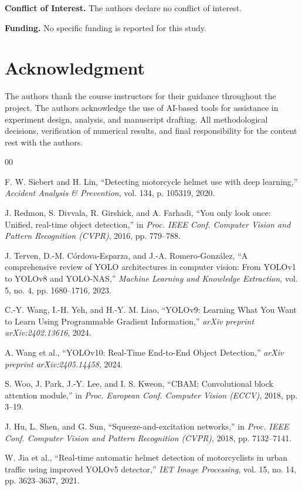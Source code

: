 \documentclass[conference]{IEEEtran}
\begin{document}
\textbf{Conflict of Interest.} The authors declare no conflict of interest.

\textbf{Funding.} No specific funding is reported for this study.

\section*{Acknowledgment}

The authors thank the course instructors for their guidance throughout the project. The authors acknowledge the use of AI-based tools for assistance in experiment design, analysis, and manuscript drafting. All methodological decisions, verification of numerical results, and final responsibility for the content rest with the authors.

\begin{thebibliography}{00}

 F. W. Siebert and H. Lin, ``Detecting motorcycle helmet use with deep learning,'' \textit{Accident Analysis \& Prevention}, vol. 134, p. 105319, 2020.

 J. Redmon, S. Divvala, R. Girshick, and A. Farhadi, ``You only look once: Unified, real-time object detection,'' in \textit{Proc. IEEE Conf. Computer Vision and Pattern Recognition (CVPR)}, 2016, pp. 779--788.

 J. Terven, D.-M. C\'ordova-Esparza, and J.-A. Romero-Gonz\'alez, ``A comprehensive review of YOLO architectures in computer vision: From YOLOv1 to YOLOv8 and YOLO-NAS,'' \textit{Machine Learning and Knowledge Extraction}, vol. 5, no. 4, pp. 1680--1716, 2023.

 C.-Y. Wang, I.-H. Yeh, and H.-Y. M. Liao, ``YOLOv9: Learning What You Want to Learn Using Programmable Gradient Information,'' \textit{arXiv preprint arXiv:2402.13616}, 2024.

 A. Wang et al., ``YOLOv10: Real-Time End-to-End Object Detection,'' \textit{arXiv preprint arXiv:2405.14458}, 2024.

 S. Woo, J. Park, J.-Y. Lee, and I. S. Kweon, ``CBAM: Convolutional block attention module,'' in \textit{Proc. European Conf. Computer Vision (ECCV)}, 2018, pp. 3--19.

 J. Hu, L. Shen, and G. Sun, ``Squeeze-and-excitation networks,'' in \textit{Proc. IEEE Conf. Computer Vision and Pattern Recognition (CVPR)}, 2018, pp. 7132--7141.

 W. Jia et al., ``Real-time automatic helmet detection of motorcyclists in urban traffic using improved YOLOv5 detector,'' \textit{IET Image Processing}, vol. 15, no. 14, pp. 3623--3637, 2021.


\end{thebibliography}
\end{document}
